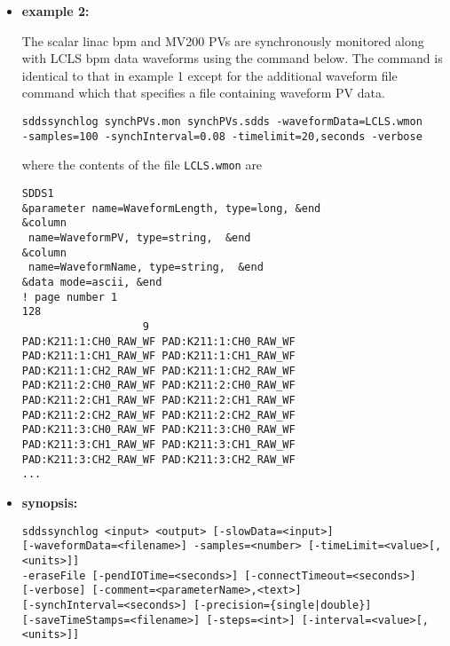 \begin{itemize}
\begin{verbatim}
\end{verbatim}
\item {\bf example 2:} 
%
% 
%

The scalar linac bpm and MV200 PVs are synchronously monitored along
with LCLS bpm data waveforms using the command below.  The command is
identical to that in example 1 except for the additional waveform file
command which that specifies a file containing waveform PV data.
\begin{verbatim}
sddssynchlog synchPVs.mon synchPVs.sdds -waveformData=LCLS.wmon
-samples=100 -synchInterval=0.08 -timelimit=20,seconds -verbose
\end{verbatim}
where the contents of the file \verb+LCLS.wmon+ are
\begin{verbatim}
SDDS1
&parameter name=WaveformLength, type=long, &end
&column
 name=WaveformPV, type=string,  &end
&column
 name=WaveformName, type=string,  &end
&data mode=ascii, &end
! page number 1
128
                   9
PAD:K211:1:CH0_RAW_WF PAD:K211:1:CH0_RAW_WF 
PAD:K211:1:CH1_RAW_WF PAD:K211:1:CH1_RAW_WF 
PAD:K211:1:CH2_RAW_WF PAD:K211:1:CH2_RAW_WF 
PAD:K211:2:CH0_RAW_WF PAD:K211:2:CH0_RAW_WF 
PAD:K211:2:CH1_RAW_WF PAD:K211:2:CH1_RAW_WF 
PAD:K211:2:CH2_RAW_WF PAD:K211:2:CH2_RAW_WF 
PAD:K211:3:CH0_RAW_WF PAD:K211:3:CH0_RAW_WF 
PAD:K211:3:CH1_RAW_WF PAD:K211:3:CH1_RAW_WF 
PAD:K211:3:CH2_RAW_WF PAD:K211:3:CH2_RAW_WF 
...
\end{verbatim}
\item {\bf synopsis:} 
%
%
\begin{verbatim}
sddssynchlog <input> <output> [-slowData=<input>]
[-waveformData=<filename>] -samples=<number> [-timeLimit=<value>[,<units>]]
-eraseFile [-pendIOTime=<seconds>] [-connectTimeout=<seconds>]
[-verbose] [-comment=<parameterName>,<text>]
[-synchInterval=<seconds>] [-precision={single|double}]
[-saveTimeStamps=<filename>] [-steps=<int>] [-interval=<value>[,<units>]] 


\end{verbatim}
\end{itemize}
